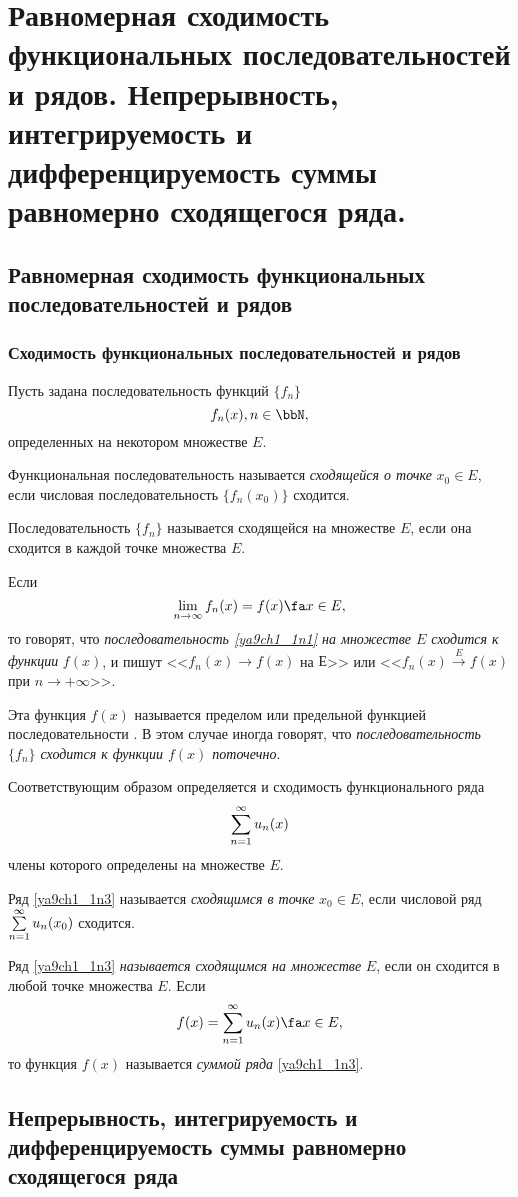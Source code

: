 \chapter{Равномерная сходимость функциональных последовательностей и рядов. Непрерывность, интегрируемость и дифференцируемость суммы равномерно сходящегося ряда.}

\section{Равномерная сходимость функциональных последовательностей и рядов}

\subsection{Сходимость функциональных последовательностей и рядов}

Пусть задана последовательность функций $\{f_n\}$
\begin{equation} \label{ya9ch1_1n1}
f_n(x), n\in \bbN, 
\end{equation}
определенных на некотором множестве $E$.
\begin{defn} Функциональная последовательность называется \textit{сходящейся о точке} $x_0 \in E$, если числовая последовательность $\{f_n(x_0)\}$ сходится.

Последовательность $\{f_n\}$ называется сходящейся на множестве $E$, если она сходится в каждой точке множества $E$.

Если
\begin{equation} \label{ya9ch1_1n2}
\lim_{n \to \infty} f_n(x) = f(x) \fa x\in E,
\end{equation}
то говорят, что \textit{последовательность \eqref{ya9ch1_1n1} на множестве $E$ сходится к функции} $f(x)$, и пишут <<$f_n(x)\to f(x)$ на $Е$>> или <<$f_n(x) \xrightarrow{E} f(x)$ при $n \to +\infty $>>.

Эта функция $f(x)$ называется пределом или предельной функцией последовательности . В этом случае иногда говорят, что \textit{последовательность $\{f_n\}$ сходится к функции $f(x)$ поточечно}.
\end{defn}

Соответствующим образом определяется и сходимость функционального ряда
\begin{equation} \label{ya9ch1_1n3}
\sum_{n=1}^{\infty}\limits u_n(x)
\end{equation}
члены которого определены на множестве $E$.
\begin{defn} Ряд \eqref{ya9ch1_1n3} называется \textit{сходящимся в точке} $x_0 \in E$, если числовой ряд $\sum_{n=1}^{\infty}\limits u_n(x_0)$ сходится.

Ряд \eqref{ya9ch1_1n3} \textit{называется сходящимся на множестве} $E$, если он сходится в любой точке множества $E$. Если
\begin{equation} \label{ya9ch1_1n4}
f(x)=\sum_{n=1}^{\infty}\limits u_n(x) \fa x \in E,
\end{equation}
то функция $f(x)$ называется \textit{суммой ряда} \eqref{ya9ch1_1n3}.
\end{defn}

\section{Непрерывность, интегрируемость и дифференцируемость суммы равномерно сходящегося ряда}
